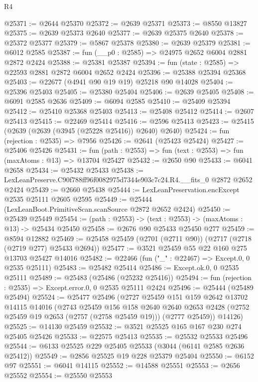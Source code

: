 \begin{lexlean}{R4}
\begin{coremodule}
@25371 := @2644 @25370
@25372 := @2639 @25371
@25373 := @8550 @13827
@25375 := @2639 @25373 @2640
@25377 := @2639 @25375 @2640
@25378 := @25372 @25377
@25379 := @5867 @25378
@25380 := @2639 @25379
@25381 := @6012 @2585
@25387 := fun (__p0 : @2585) => @24975 @2652 @6004 @2881 @2872 @2424
@25388 := @25381 @25387
@25394 := fun (state : @2585) => @22593 @2881 @2872 @6004 @2652 @2424
@25396 := @25388 @25394 @25368
@25403 := @22677 (@4941 @90 @19 @19) @25218 @90 @14028
@25404 := @25396 @25403
@25405 := @25380 @25404
@25406 := @2639 @25405
@25408 := @6091 @2585 @2636
@25409 := @6094 @2585
@25410 := @25409 @25394
@25412 := @25410 @25368 @25403
@25413 := @25408 @25412
@25414 := @2607 @25413
@25415 := @22469 @25414
@25416 := @2596 @25413
@25423 := @25415 (@2639 (@2639 (@3945 (@25228 @25416)) @2640) @2640)
@25424 := fun (rejection : @2535) => @7956
@25426 := @2641 (@25423 @25424)
@25427 := @25406 @25426
@25431 := fun (path : @2553) => fun (text : @2553) => fun (maxAtoms : @13) => @13704 @25427
@25432 := @2650 @90
@25433 := @6041 @2658
@25434 := @25432 @25433
@25438 := LexLeanPreserve.C90f788ff96f0082975d7344e903c7c24.R4.__fits_0 @2872 @2652 @2424
@25439 := @2660 @25438
@25444 := LexLeanPreservation.encExcept @2535 @25111 @2605 @2595
@25449 := @25444 (LexLeanBoot.PrimitiveScan.scanSource @2872 @2652 @2424)
@25450 := @25439 @25449
@25454 := (path : @2553) -> (text : @2553) -> (maxAtoms : @13) -> @25434 @25450
@25458 := @2676 @90 @25433 @25450 @277
@25459 := @8594 @12882
@25469 := @25458 @25459 (@2701 (@2711 @90)) (@2717 (@2718 (@2719 @277) @25433 @2694))
@25477 := @3521 @25459 @55 @22 @160 @275 @13703 @25427 @14016
@25482 := @22466 (fun ("_" : @22467) => Except.{0, 0} @2535 @25111)
@25483 := @25482 @25414
@25486 := Except.ok.{0, 0} @2535 @25111
@25489 := @25483 (@25486 (@25232 @25416))
@25494 := fun (rejection : @2535) => Except.error.{0, 0} @2535 @25111 @2424
@25496 := @25444 (@25489 @25494)
@25524 := @25477
    @25496
    (@2727
      @25459
      @151
      @159
      @2642
      @13702
      @14115
      @14016
      (@2743
        @25459
        @156
        @158
        @2640
        @2640
        @2653
        @2428
        (@2752 @25459 @19 @2653 (@2757 (@2758 @25459 @19)))
        (@2777 @25459))
      @14126)
@25525 := @14130 @25459
@25532 := @3521 @25525 @165 @167 @230 @274 @25405 @25426
@25533 := @22575 @25413
@25535 := @25532 @25533 @25496
@25544 := @6133 @25525 @229 @25405 @25533 (@3044 (@6141 @2585 @2636 @25412))
@25549 := @2856 @25525 @19 @228 @25379 @25404
@25550 := @6152 @97
@25551 := @6041 @14115
@25552 := @14588 @25551
@25553 := @2656 @25552
@25554 := @25550 @25553

\end{coremodule}
\end{lexlean}
